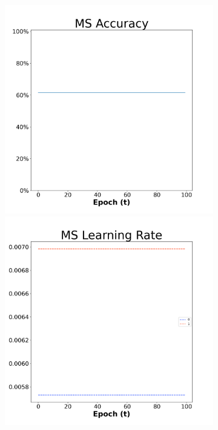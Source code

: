 \begin{figure}[H]
    \centering %
\begin{subfigure}{0.3\textwidth}
  \includegraphics[width=\linewidth]{images/exper1/SP/MS_0.01_acc.png}
    \includegraphics[width=\linewidth]{images/exper1/SP/MS_0.01_lr.png}

\end{subfigure}
\end{figure}
